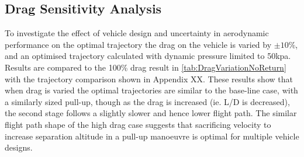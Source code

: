 \subsection{Drag Sensitivity Analysis}\label{sec:dragvariation}


To investigate the effect of vehicle design and uncertainty in aerodynamic performance on the optimal trajectory the drag on the vehicle is varied by $\pm10$\%, and an optimised trajectory calculated with dynamic pressure limited to 50kpa. Results are compared to the 100\% drag result in \ref{tab:DragVariationNoReturn} with the trajectory comparison shown in Appendix XX. 
These results show that when drag is varied the optimal trajectories are similar to the base-line case, with a similarly sized pull-up, though as the drag is increased (ie. L/D is decreased), the second stage follows a slightly slower and hence lower flight path. The similar flight path shape of the high drag case suggests that sacrificing velocity to increase separation altitude in a pull-up manoeuvre is optimal for multiple vehicle designs.

